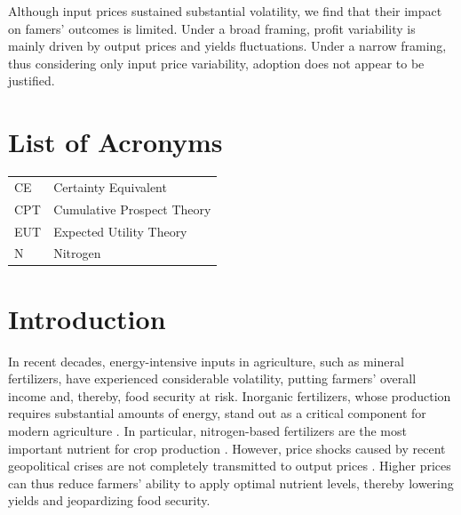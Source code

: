 \documentclass[12pt,a4paper]{article}
\begin{document}
Although input prices sustained substantial volatility, we find that their impact on famers' outcomes is limited. Under a broad framing, profit variability is mainly driven by output prices and yields fluctuations. Under a narrow framing, thus considering only input price variability, adoption does not appear to be justified.

\newpage

\section*{List of Acronyms}

\begin{tabular}{ll}
CE & Certainty Equivalent \\
CPT & Cumulative Prospect Theory \\
EUT & Expected Utility Theory \\
N & Nitrogen \\
\end{tabular}

\newpage

\listoffigures
\listoftables

\newpage
\tableofcontents
\newpage

\section{Introduction}

In recent decades, energy-intensive inputs in agriculture, such as mineral fertilizers, have experienced considerable volatility, putting farmers' overall income and, thereby, food security at risk. Inorganic fertilizers, whose production requires substantial amounts of energy, stand out as a critical component for modern agriculture \citep{EuropeanCommission2022, FAO2024}. In particular, nitrogen-based fertilizers are the most important nutrient for crop production \citep{IFA2022}. However, price shocks caused by recent geopolitical crises are not completely transmitted to output prices \citep{Dong2025}. Higher prices can thus reduce farmers' ability to apply optimal nutrient levels, thereby lowering yields and jeopardizing food security.
\end{document}
